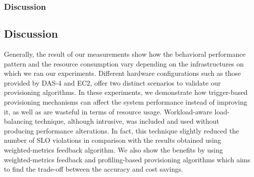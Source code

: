 \subsubsection{Discussion}



\subsection{Discussion}



Generally, the result of our measurements show how the behavioral performance pattern and the resource consumption vary depending on the infrastructures on which we ran our experiments. Different hardware configurations such as those provided by DAS-4 and EC2, offer two distinct scenarios to validate our provisioning algorithms.  In these experiments, we demonstrate how trigger-based provisioning mechanisms can affect the system performance instead of improving it, as well as are wasteful in terms of resource usage. Workload-aware load-balancing technique, although intrusive, was included and used without producing performance alterations. In fact, this technique slightly reduced the number of SLO violations in comparison with the results obtained using weighted-metrics feedback algorithm. We also show the benefits by using weighted-metrics feedback and profiling-based provisioning algorithms which aims to find the trade-off between the accuracy and cost savings. 





